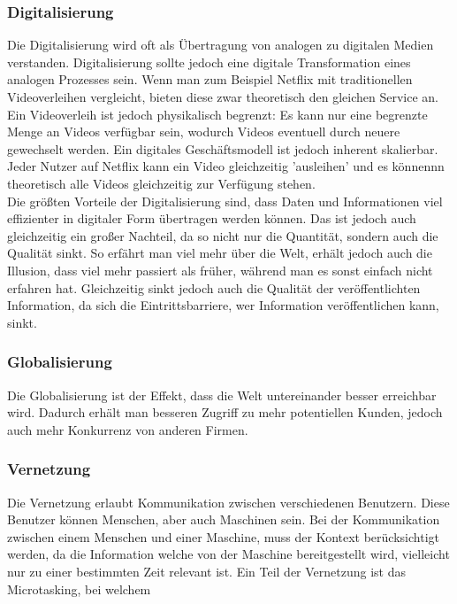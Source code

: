 \documentclass{article}
\begin{document}
		\subsubsection{Digitalisierung}
		Die Digitalisierung wird oft als Übertragung von analogen zu digitalen Medien verstanden. Digitalisierung sollte jedoch eine digitale Transformation eines analogen Prozesses sein. Wenn man zum Beispiel Netflix mit traditionellen Videoverleihen vergleicht, bieten diese zwar theoretisch den gleichen Service an. Ein Videoverleih ist jedoch physikalisch begrenzt: Es kann nur eine begrenzte Menge an Videos verfügbar sein, wodurch Videos eventuell durch neuere gewechselt werden. Ein digitales Geschäftsmodell ist jedoch inherent skalierbar. Jeder Nutzer auf Netflix kann ein Video gleichzeitig 'ausleihen' und es könnennn theoretisch alle Videos gleichzeitig zur Verfügung stehen. \\
		Die größten Vorteile der Digitalisierung sind, dass Daten und Informationen viel effizienter in digitaler Form übertragen werden können. Das ist jedoch auch gleichzeitig ein großer Nachteil, da so nicht nur die Quantität, sondern auch die Qualität sinkt. So erfährt man viel mehr über die Welt, erhält jedoch auch die Illusion, dass viel mehr passiert als früher, während man es sonst einfach nicht erfahren hat. Gleichzeitig sinkt jedoch auch die Qualität der veröffentlichten Information, da sich die Eintrittsbarriere, wer Information veröffentlichen kann, sinkt. \\
		\subsubsection{Globalisierung}
		Die Globalisierung ist der Effekt, dass die Welt untereinander besser erreichbar wird. Dadurch erhält man besseren Zugriff zu mehr potentiellen Kunden, jedoch auch mehr Konkurrenz von anderen Firmen. 
		\subsubsection{Vernetzung}
		Die Vernetzung erlaubt Kommunikation zwischen verschiedenen Benutzern. Diese Benutzer können Menschen, aber auch Maschinen sein. Bei der Kommunikation zwischen einem Menschen und einer Maschine, muss der Kontext berücksichtigt werden, da die Information welche von der Maschine bereitgestellt wird, vielleicht nur zu einer bestimmten Zeit relevant ist. Ein Teil der Vernetzung ist das Microtasking, bei welchem

	























  
\end{document}
